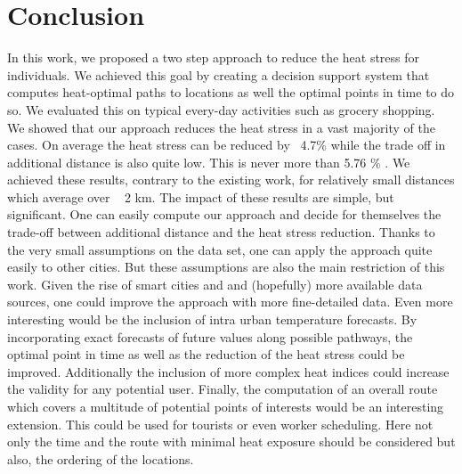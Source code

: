 
\section{Conclusion}

In this work, we proposed a two step approach to reduce the heat stress for individuals. We achieved this goal by creating a decision support system that computes heat-optimal paths to locations as well the optimal points in time to do so. We evaluated this on typical every-day activities such as grocery shopping. 
We showed that our approach reduces the heat stress in a vast majority of the cases. On average the heat stress can be reduced by ~4.7\% while the trade off in additional distance is also quite low. This is never more than 5.76 \% . We achieved these results, contrary to the existing work, for relatively small distances which average over ~ 2 km.
The impact of these results are simple, but significant. One can easily compute our approach and decide for themselves the trade-off between additional distance and the heat stress reduction.
Thanks to the very small assumptions on the data set, one can apply the approach quite easily to other cities. 
But these assumptions are also the main restriction of this work. Given the rise of smart cities and and (hopefully) more available data sources, one could improve the approach with more fine-detailed data. Even more interesting would be the inclusion of intra urban temperature forecasts. By incorporating exact forecasts of future values along possible pathways, the optimal point in time as well as the reduction of the heat stress could be improved. Additionally the inclusion of more complex heat indices could increase the validity for any potential user. 
Finally, the computation of an overall route which covers a multitude of potential points of interests would be an interesting extension. This could be used for tourists or even worker scheduling. Here not only the time and the route with minimal heat exposure should be considered but also, the ordering of the locations.  